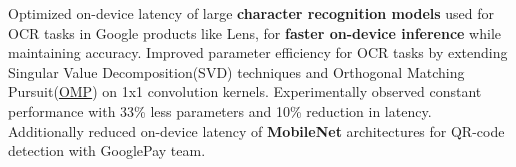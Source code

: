 \documentclass[11pt,a4paper,sans]{moderncv}        %
\begin{document}
\vspace{0.3 cm}

{Optimized on-device latency of large \textbf{character recognition models} used for OCR tasks in Google products like Lens, for \textbf{faster on-device inference} while maintaining accuracy. Improved parameter efficiency for OCR tasks by extending Singular Value Decomposition(SVD) techniques and Orthogonal Matching Pursuit(\href{https://ieeexplore.ieee.org/abstract/document/342465/}{OMP}) on 1x1 convolution kernels. Experimentally observed constant performance with 33\% less parameters and 10\% reduction in latency. Additionally reduced on-device latency of \textbf{MobileNet} architectures for QR-code detection with GooglePay team.}

\vspace{0.3 cm}
\end{document}
